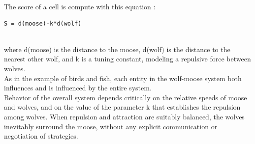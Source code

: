 The score of a cell is compute with this equation :
\begin{lstlisting}[frame=trBL, title=Score calculation]
			S = d(moose)-k*d(wolf)
\end{lstlisting}
~\\
where d(moose) is the distance to the moose, d(wolf) is the distance to the nearest other wolf, and k is a
tuning constant, modeling a repulsive force between wolves.\\

As in the example of birds and fish, each entity in the wolf-moose system both influences and is influenced by the entire system.\\
Behavior of the overall system depends critically on the relative speeds of moose and wolves, and on the value of the parameter k that establishes the repulsion among wolves. When repulsion and attraction are suitably balanced, the wolves inevitably surround the moose, without any explicit communication or negotiation of strategies.
